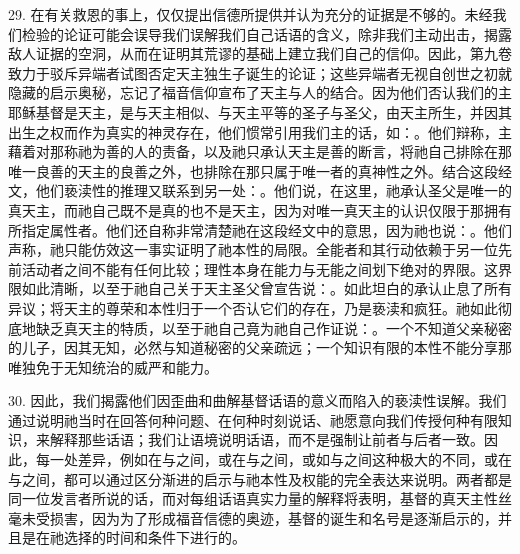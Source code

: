 29. 在有关救恩的事上，仅仅提出信德所提供并认为充分的证据是不够的。未经我们检验的论证可能会误导我们误解我们自己话语的含义，除非我们主动出击，揭露敌人证据的空洞，从而在证明其荒谬的基础上建立我们自己的信仰。因此，第九卷致力于驳斥异端者试图否定天主独生子诞生的论证；这些异端者无视自创世之初就隐藏的启示奥秘，忘记了福音信仰宣布了天主与人的结合。因为他们否认我们的主耶稣基督是天主，是与天主相似、与天主平等的圣子与圣父，由天主所生，并因其出生之权而作为真实的神灵存在，他们惯常引用我们主的话，如：。他们辩称，主藉着对那称祂为善的人的责备，以及祂只承认天主是善的断言，将祂自己排除在那唯一良善的天主的良善之外，也排除在那只属于唯一者的真神性之外。结合这段经文，他们亵渎性的推理又联系到另一处：。他们说，在这里，祂承认圣父是唯一的真天主，而祂自己既不是真的也不是天主，因为对唯一真天主的认识仅限于那拥有所指定属性者。他们还自称非常清楚祂在这段经文中的意思，因为祂也说：。他们声称，祂只能仿效这一事实证明了祂本性的局限。全能者和其行动依赖于另一位先前活动者之间不能有任何比较；理性本身在能力与无能之间划下绝对的界限。这界限如此清晰，以至于祂自己关于天主圣父曾宣告说：。如此坦白的承认止息了所有异议；将天主的尊荣和本性归于一个否认它们的存在，乃是亵渎和疯狂。祂如此彻底地缺乏真天主的特质，以至于祂自己竟为祂自己作证说：。一个不知道父亲秘密的儿子，因其无知，必然与知道秘密的父亲疏远；一个知识有限的本性不能分享那唯独免于无知统治的威严和能力。\par

30. 因此，我们揭露他们因歪曲和曲解基督话语的意义而陷入的亵渎性误解。我们通过说明祂当时在回答何种问题、在何种时刻说话、祂愿意向我们传授何种有限知识，来解释那些话语；我们让语境说明话语，而不是强制让前者与后者一致。因此，每一处差异，例如在与之间，或在与之间，或如与之间这种极大的不同，或在与之间，都可以通过区分渐进的启示与祂本性及权能的完全表达来说明。两者都是同一位发言者所说的话，而对每组话语真实力量的解释将表明，基督的真天主性丝毫未受损害，因为为了形成福音信德的奥迹，基督的诞生和名号是逐渐启示的，并且是在祂选择的时间和条件下进行的。\par

